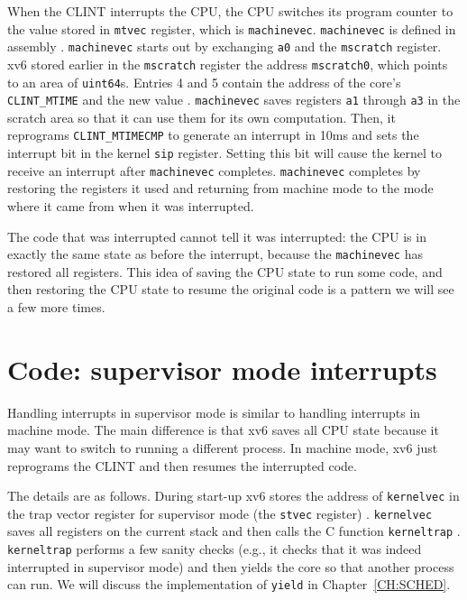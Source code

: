 When the CLINT interrupts the CPU, the CPU switches its
program counter to the value stored in \lstinline{mtvec} register,
which is \lstinline{machinevec}.  \lstinline{machinevec} is defined in
assembly .
\lstinline{machinevec} starts out by exchanging \lstinline{a0} and the
\lstinline{mscratch} register.  xv6 stored earlier in the
\lstinline{mscratch} register  the
address \lstinline{mscratch0}, which points to an area of
\lstinline{uint64}s.  Entries 4 and 5 contain the address of the
core's \lstinline{CLINT_MTIME} and the new value
.
\lstinline{machinevec} saves registers \lstinline{a1} through
\lstinline{a3} in the scratch area so that it can use them for its own
computation.  Then, it reprograms \lstinline{CLINT_MTIMECMP} to
generate an interrupt in 10ms and sets the interrupt bit in the kernel
\lstinline{sip} register.  Setting this bit will cause the kernel to
receive an interrupt after \lstinline{machinevec} completes.
\lstinline{machinevec} completes by restoring the registers it used
and returning from machine mode  to
the mode where it came from when it was interrupted.

The code that was interrupted cannot tell it was interrupted: the
CPU is in exactly the same state as before the interrupt,
because the \lstinline{machinevec} has restored all registers.  This
idea of saving the CPU state to run some code, and then
restoring the CPU state to resume the original code is a pattern
we will see a few more times.

\section{Code: supervisor mode interrupts}

Handling interrupts in supervisor mode is similar to handling
interrupts in machine mode.  The main difference is that xv6 saves all
CPU state because it may want to switch to running a different
process.  In machine mode, xv6 just reprograms the CLINT and then
resumes the interrupted code.

The details are as follows. During start-up xv6 stores the address of
\lstinline{kernelvec} in the trap vector register for supervisor mode
(the \lstinline{stvec} register)
.  \lstinline{kernelvec} saves
all registers on the current stack
and then calls the C function \lstinline{kerneltrap}
.  \lstinline{kerneltrap}
 performs a few sanity checks
(e.g., it checks that it was indeed interrupted in supervisor mode) and
then yields the core so that another process can run.  We will discuss
the implementation of \lstinline{yield} in Chapter~\ref{CH:SCHED}.

